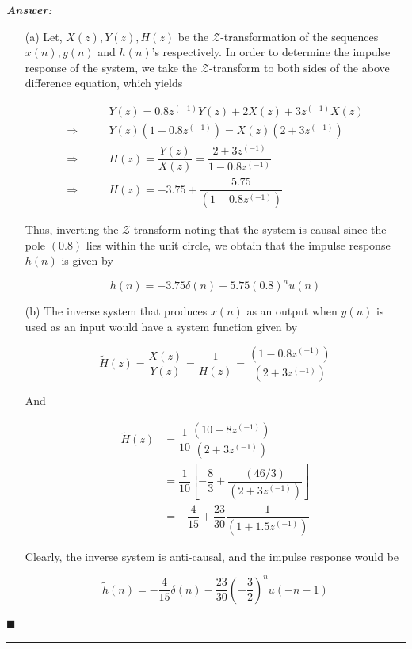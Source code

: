 \documentclass[12pt]{article}
\theoremstyle{definition}
\newenvironment{answer}{
    \textbf{\textit{Answer:}} \qquad
}{\hfill $\blacksquare$ \\ 

\begin{center}
    \rule{0.8\linewidth}{1.5px} 
    \vspace*{1cm}   
\end{center}
}
\newcommand{\zcal}{\mathcal{Z}}
\newcommand{\inv}[1][1]{^{(- #1)}}
\begin{document}
\begin{answer}
    \begin{enumerate}
        \item[(a)] Let, $X(z), Y(z), H(z)$ be the $\zcal$-transformation of the sequences $x(n), y(n)$ and $h(n)$'s respectively. In order to determine the impulse response of the system, we take the $\zcal$-transform to both sides of the above difference equation, which yields 
        
        \begin{align*}
            & Y(z) = 0.8 z\inv Y(z) + 2 X(z) + 3 z\inv X(z)\\
            \Rightarrow \qquad & Y(z)(1 - 0.8z\inv) = X(z) (2 + 3z\inv)\\
            \Rightarrow \qquad & H(z) = \dfrac{Y(z)}{X(z)} = \dfrac{2 + 3z\inv}{1 - 0.8z\inv}\\
            \Rightarrow \qquad & H(z) = -3.75 + \dfrac{5.75}{(1 - 0.8z\inv)}
        \end{align*}

        Thus, inverting the $\zcal$-transform noting that the system is causal since the pole $(0.8)$ lies within the unit circle, we obtain that the impulse response $h(n)$ is given by 

        $$
        h(n) = -3.75\delta(n) + 5.75 (0.8)^n u(n)
        $$

        \item[(b)] The inverse system that produces $x(n)$ as an output when $y(n)$ is used as an input would have a system function given by 
        
        $$
        \widetilde{H}(z) = \dfrac{X(z)}{Y(z)} = \dfrac{1}{H(z)} = \dfrac{(1 - 0.8z\inv)}{(2 + 3z\inv)}
        $$

        And
        
        \begin{align*}
            \widetilde{H}(z)
            & = \dfrac{1}{10} \dfrac{(10 - 8z\inv)}{(2 + 3z\inv)}\\
            & = \dfrac{1}{10} \left[ -\dfrac{8}{3} + \dfrac{(46/3)}{(2 + 3z\inv)} \right]\\
            & = -\dfrac{4}{15} + \dfrac{23}{30} \dfrac{1}{(1 + 1.5z\inv)}
        \end{align*}

        Clearly, the inverse system is anti-causal, and the impulse response would be

        $$
        \widetilde{h}(n) = -\dfrac{4}{15}\delta(n) - \dfrac{23}{30} \left( -\dfrac{3}{2} \right)^n u(-n-1)
        $$

    \end{enumerate}

\end{answer}
\end{document}
